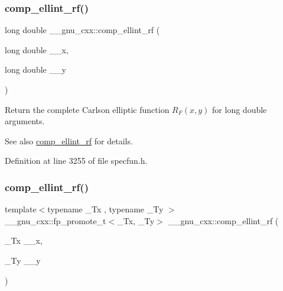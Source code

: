 \subsubsection{\texorpdfstring{comp\+\_\+ellint\+\_\+rf()}{comp\_ellint\_rf()}\hspace{0.1cm}{\footnotesize\ttfamily [2/3]}}
{\footnotesize\ttfamily long double \+\_\+\+\_\+gnu\+\_\+cxx\+::comp\+\_\+ellint\+\_\+rf (\begin{DoxyParamCaption}\item[{long double}]{\+\_\+\+\_\+x,  }\item[{long double}]{\+\_\+\+\_\+y }\end{DoxyParamCaption})\hspace{0.3cm}{\ttfamily [inline]}}

Return the complete Carlson elliptic function $ R_F(x,y) $ for {\ttfamily long double} arguments.

\begin{DoxySeeAlso}{See also}
\hyperlink{group__mathsf__gnu_ga55ae30b4f8ff15017d18a80050e14e38}{comp\+\_\+ellint\+\_\+rf} for details. 
\end{DoxySeeAlso}


Definition at line 3255 of file specfun.\+h.

\mbox{\label{group__mathsf__gnu_gaf6450c88127cf771acfc0667914266d1}} 
\subsubsection{\texorpdfstring{comp\+\_\+ellint\+\_\+rf()}{comp\_ellint\_rf()}\hspace{0.1cm}{\footnotesize\ttfamily [3/3]}}
{\footnotesize\ttfamily template$<$typename \+\_\+\+Tx , typename \+\_\+\+Ty $>$ \\
\+\_\+\+\_\+gnu\+\_\+cxx\+::fp\+\_\+promote\+\_\+t$<$\+\_\+\+Tx, \+\_\+\+Ty$>$ \+\_\+\+\_\+gnu\+\_\+cxx\+::comp\+\_\+ellint\+\_\+rf (\begin{DoxyParamCaption}\item[{\+\_\+\+Tx}]{\+\_\+\+\_\+x,  }\item[{\+\_\+\+Ty}]{\+\_\+\+\_\+y }\end{DoxyParamCaption})\hspace{0.3cm}{\ttfamily [inline]}}

